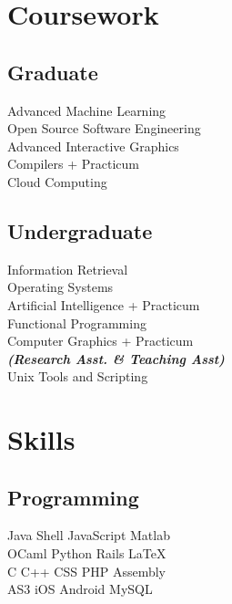 \documentclass[]{deedy-resume-openfont}
\begin{document}
\begin{minipage}[t]{0.33\textwidth}

\section{Coursework}
\subsection{Graduate}
Advanced Machine Learning \\
Open Source Software Engineering \\
Advanced Interactive Graphics \\
Compilers + Practicum \\
Cloud Computing \\
\sectionsep

\subsection{Undergraduate}
Information Retrieval \\
Operating Systems \\
Artificial Intelligence + Practicum \\
Functional Programming \\
Computer Graphics + Practicum \\
{\footnotesize \textit{\textbf{(Research Asst. \& Teaching Asst) }}} \\
Unix Tools and Scripting \\
\sectionsep


\section{Skills}
\subsection{Programming}
Java \textbullet{}   Shell \textbullet{} JavaScript \textbullet{} Matlab \\
OCaml \textbullet{} Python \textbullet{} Rails \textbullet{} \LaTeX\ \\ 
C \textbullet{} C++ \textbullet{} CSS \textbullet{} PHP \textbullet{} Assembly \\
AS3 \textbullet{} iOS \textbullet{} Android \textbullet{} MySQL
\sectionsep

%
%

\end{minipage} 
\end{document}
